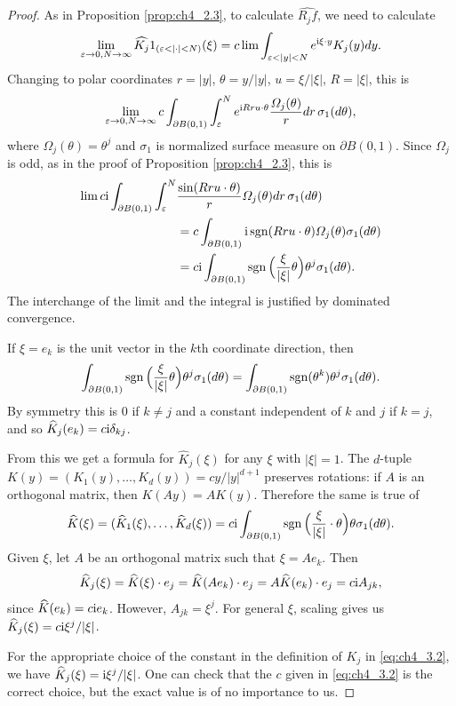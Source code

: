 \begin{proof}
As in Proposition \ref{prop:ch4_2.3}, to calculate $\widehat{R_j f}$, we need to calculate
\[
    \lim_{\epsilon\to 0,N\to\infty} \widehat{K_j}1_{(\epsilon<|\cdot|<N)}(\xi) = c\lim \int_{\epsilon<|y|<N} e^{\im\xi\cdot y}K_j(y)dy.
\]
Changing to polar coordinates $r=|y|$, $\theta = y/|y|$, $u=\xi/|\xi|$, $R=|\xi|$, this is
\[
    \lim_{\varepsilon\to 0,N\to\infty} c\int_{\partial B(0,1)} \int_\varepsilon^N e^{\mathrm{i} Rru\cdot\theta}\frac{\varOmega_j(\theta)}{r}dr\,\sigma_1(d\theta),
\]
where $\Omega_j(\theta) = \theta^j$ and $\sigma_1$ is normalized surface measure on $\partial B(0,1)$. Since $\Omega_j$ is odd, as in the proof of Proposition \ref{prop:ch4_2.3}, this is
\begin{align*}
    \lim c\mathrm{i}\int_{\partial B(0,1)}\int_\varepsilon^N &\frac{\sin(Rru\cdot \theta)}{r}\varOmega_j(\theta)dr\,\sigma_1(d\theta) \\
    &= c\int_{\partial B(0,1)}\mathrm{i} \operatorname{sgn}(Rru\cdot \theta)\varOmega_j(\theta)\sigma_1(d\theta) \\
    &= c\mathrm{i}\int_{\partial B(0,1)} \operatorname{sgn}\Big(\frac{\xi}{|\xi|}\theta\Big)\theta^j\sigma_1(d\theta).
\end{align*}
The interchange of the limit and the integral is justified by dominated convergence.

If $\xi = e_k$ is the unit vector in the $k$th coordinate direction, then
\[
    \int_{\partial B(0,1)} \operatorname{sgn}\Big(\frac{\xi}{|\xi|}\theta\Big)\theta^j\sigma_1(d\theta) = \int_{\partial B(0,1)} \operatorname{sgn}(\theta^k)\theta^j\sigma_1(d\theta).
\]
By symmetry this is $0$ if $k \neq j$ and a constant independent of $k$ and $j$ if $k=j$, and so $\widehat{K}_j(e_k) = c\mathrm{i}\delta_{kj}$.

From this we get a formula for $\widehat{K}_j(\xi)$ for any $\xi$ with $|\xi| = 1$. The $d$-tuple $K(y) = (K_1(y),\ldots,K_d(y)) = cy/|y|^{d+1}$ preserves rotations: if $A$ is an orthogonal matrix, then $K(Ay) = AK(y)$. Therefore the same is true of
\[
    \widehat{K}(\xi) = (\widehat{K}_1(\xi),\ldots,\widehat{K}_d(\xi)) = c\mathrm{i}\int_{\partial B(0,1)} \operatorname{sgn}\Big(\frac{\xi}{|\xi|}\cdot\theta\Big)\theta\sigma_1(d\theta).
\]
Given $\xi$, let $A$ be an orthogonal matrix such that $\xi = Ae_k$. Then
\[
    \widehat{K}_j(\xi) = \widehat{K}(\xi)\cdot e_j = \widehat{K}(Ae_k)\cdot e_j = A\widehat{K}(e_k)\cdot e_j = c\mathrm{i} A_{jk},
\]
since $\widehat{K}(e_k) = c\mathrm{i} e_k$. However, $A_{jk} = \xi^j$. For general $\xi$, scaling gives us $\widehat{K}_j(\xi) = c\mathrm{i} \xi^j/|\xi|$.

For the appropriate choice of the constant in the definition of $K_j$ in \eqref{eq:ch4_3.2}, we have $\widehat{K}_j(\xi) = \mathrm{i} \xi^j/|\xi|$. One can check that the $c$ given in \eqref{eq:ch4_3.2} is the correct choice, but the exact value is of no importance to us.
\end{proof}

